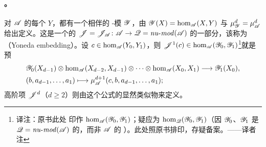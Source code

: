 \paragraph{\trYonedaEmbedding。}\label{sub:yoneda-embedding}
对 $\mathscr{A}$ 的每个\trObject{} $Y$，都有一个相伴的\trNonunital{} \trAinfty-模
$\mathscr{Y}$，由 $\mathscr{Y}(X)=\hom_{\mathscr{A}}(X,Y)$ 与 $\mu^d_{\mathscr{Y}}=\mu^d_{\mathscr{A}}$
给出定义。这是一个\trCanonical{}的\trNonunital{} \trAFunctor
$\mathscr{J}=\mathscr{J}_{\mathscr{A}}\colon\mathscr{A}\to\mathscr{Q}
=\mathit{nu}\text{-}\mathit{mod}(\mathscr{A})$ 的一部分，该\trFunctor{}称为%
\textbf{\trYonedaEmbedding}（Yoneda embedding）。设
$c\in\hom_{\mathscr{A}}(Y_0,Y_1)$，则
$\mathscr{J}^1(c)\in\hom_{\mathscr{A}}(\mathscr{Y}_0,\mathscr{Y}_1)$\footnote{译注：原书此处
印作 $\hom_{\mathscr{A}}(\mathscr{Y}_0,\mathscr{Y}_1)$；疑应为
$\hom_{\mathscr{Q}}(\mathscr{Y}_0,\mathscr{Y}_1)$（因 $\mathscr{Y}_0$、$\mathscr{Y}_1$ 是
$\mathscr{Q}=\mathit{nu}\text{-}\mathit{mod}(\mathscr{A})$ 的\trObject{}，而非 $\mathscr{A}$ 的%
\trObject）。此处照原书排印，存疑备案。——译者注}就是预\trModule\trHomomorphism
\begin{equation*}
\begin{aligned}
&\mathscr{Y}_0(X_{d-1})\otimes\hom_{\mathscr{A}}(X_{d-2},X_{d-1})
\otimes\cdots\otimes\hom_{\mathscr{A}}(X_0,X_1)
\longrightarrow\mathscr{Y}_1(X_0),\\
&(b,a_{d-1},\ldots,a_1)\longmapsto\mu^{d+1}_{\mathscr{A}}(c,b,a_{d-1},\ldots,a_1);
\end{aligned}
\end{equation*}
高阶项 $\mathscr{J}^d$（$d\ge 2$）则由这个公式的显然类似物来定义。

